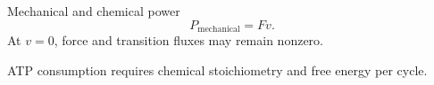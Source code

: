 \documentclass[aspectratio=169,11pt]{beamer}
\newcommand{\notestarget}{notes.pdf}\newcommand{\noteslabel}{Notes}
\begin{document}
\renewcommand{\notestarget}{notes.pdf\#note-computation-and-the-scope-of-a-force-measurement}
\begin{frame}[t,fragile,label=slide-mechanical-and-chemical-power]{Mechanical and chemical power}
\[P_{\mathrm{mechanical}}=Fv.\]\pause{} At $v=0$, force and transition fluxes may remain nonzero.\par\medskip ATP consumption requires chemical stoichiometry and free energy per cycle.
\end{frame}
\end{document}
